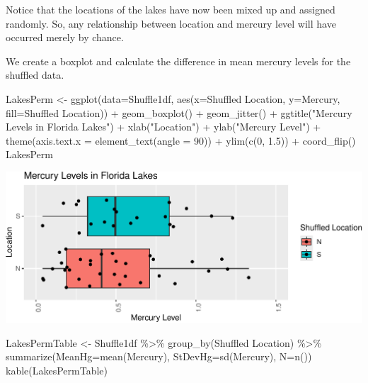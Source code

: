 \documentclass[
  letterpaper,
  DIV=11,
  numbers=noendperiod]{scrreprt}
\newenvironment{Shaded}{\begin{snugshade}}{\end{snugshade}}
\newcommand{\AttributeTok}[1]{\textcolor[rgb]{0.40,0.45,0.13}{#1}}
\newcommand{\DecValTok}[1]{\textcolor[rgb]{0.68,0.00,0.00}{#1}}
\newcommand{\FloatTok}[1]{\textcolor[rgb]{0.68,0.00,0.00}{#1}}
\newcommand{\FunctionTok}[1]{\textcolor[rgb]{0.28,0.35,0.67}{#1}}
\newcommand{\NormalTok}[1]{\textcolor[rgb]{0.00,0.23,0.31}{#1}}
\newcommand{\OtherTok}[1]{\textcolor[rgb]{0.00,0.23,0.31}{#1}}
\newcommand{\SpecialCharTok}[1]{\textcolor[rgb]{0.37,0.37,0.37}{#1}}
\newcommand{\StringTok}[1]{\textcolor[rgb]{0.13,0.47,0.30}{#1}}
\begin{document}
Notice that the locations of the lakes have now been mixed up and
assigned randomly. So, any relationship between location and mercury
level will have occurred merely by chance.

We create a boxplot and calculate the difference in mean mercury levels
for the shuffled data.

\begin{Shaded}
\begin{Highlighting}[]
\NormalTok{LakesPerm }\OtherTok{\textless{}{-}} \FunctionTok{ggplot}\NormalTok{(}\AttributeTok{data=}\NormalTok{Shuffle1df, }\FunctionTok{aes}\NormalTok{(}\AttributeTok{x=}\StringTok{\textasciigrave{}}\AttributeTok{Shuffled Location}\StringTok{\textasciigrave{}}\NormalTok{, }
                                         \AttributeTok{y=}\NormalTok{Mercury, }\AttributeTok{fill=}\StringTok{\textasciigrave{}}\AttributeTok{Shuffled Location}\StringTok{\textasciigrave{}}\NormalTok{)) }\SpecialCharTok{+} 
  \FunctionTok{geom\_boxplot}\NormalTok{() }\SpecialCharTok{+}   \FunctionTok{geom\_jitter}\NormalTok{() }\SpecialCharTok{+} \FunctionTok{ggtitle}\NormalTok{(}\StringTok{"Mercury Levels in Florida Lakes"}\NormalTok{) }\SpecialCharTok{+} 
  \FunctionTok{xlab}\NormalTok{(}\StringTok{"Location"}\NormalTok{) }\SpecialCharTok{+} \FunctionTok{ylab}\NormalTok{(}\StringTok{"Mercury Level"}\NormalTok{) }\SpecialCharTok{+} \FunctionTok{theme}\NormalTok{(}\AttributeTok{axis.text.x =} \FunctionTok{element\_text}\NormalTok{(}\AttributeTok{angle =} \DecValTok{90}\NormalTok{)) }\SpecialCharTok{+} \FunctionTok{ylim}\NormalTok{(}\FunctionTok{c}\NormalTok{(}\DecValTok{0}\NormalTok{, }\FloatTok{1.5}\NormalTok{)) }\SpecialCharTok{+} \FunctionTok{coord\_flip}\NormalTok{()}
\NormalTok{LakesPerm}
\end{Highlighting}
\end{Shaded}

\includegraphics{Ch3_files/figure-pdf/unnamed-chunk-183-1.pdf}

\begin{Shaded}
\begin{Highlighting}[]
\NormalTok{LakesPermTable }\OtherTok{\textless{}{-}}\NormalTok{ Shuffle1df }\SpecialCharTok{\%\textgreater{}\%} \FunctionTok{group\_by}\NormalTok{(}\StringTok{\textasciigrave{}}\AttributeTok{Shuffled Location}\StringTok{\textasciigrave{}}\NormalTok{) }\SpecialCharTok{\%\textgreater{}\%} \FunctionTok{summarize}\NormalTok{(}\AttributeTok{MeanHg=}\FunctionTok{mean}\NormalTok{(Mercury), }\AttributeTok{StDevHg=}\FunctionTok{sd}\NormalTok{(Mercury),  }\AttributeTok{N=}\FunctionTok{n}\NormalTok{())}
\FunctionTok{kable}\NormalTok{(LakesPermTable)}
\end{Highlighting}
\end{Shaded}
\end{document}
